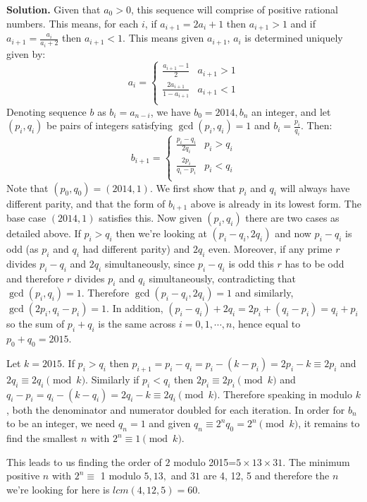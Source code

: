 \documentclass[11pt,a4paper]{article}
\begin{document}
\begin{enumerate}
	\textbf{Solution.} Given that $a_0>0$, this sequence will comprise of positive rational numbers. This means, for each $i$, if $a_{i+1}=2a_i+1$ then $a_{i+1}>1$ and if $a_{i+1}=\frac{a_i}{a_i+2}$ then $a_{i+1}<1$. This means given $a_{i+1}$, $a_i$ is determined uniquely given by: 
	\[
	a_{i}=\begin{cases}
	\frac{a_{i+1}-1}{2} & a_{i+1}> 1\\
	\frac{2a_{i+1}}{1-a_{i+1}} & a_{i+1} < 1\\
	\end{cases}
	\]
	Denoting sequence $b$ as $b_i=a_{n-i}$, we have $b_0=2014, b_n$ an integer, and let $(p_i, q_i)$ be pairs of integers satisfying $\gcd(p_i, q_i)=1$ and $b_i=\frac{p_i}{q_i}$. Then: 
	\[
	b_{i+1}=\begin{cases}
	\frac{p_i-q_i}{2q_i} & p_i>q_i\\
	\frac{2p_i}{q_i-p_i} & p_i<q_i\\
	\end{cases}
	\]
	Note that $(p_0, q_0)=(2014, 1)$. 
	We first show that $p_i$ and $q_i$ will always have different parity, and that the form of $b_{i+1}$ above is already in its lowest form. The base case $(2014, 1)$ satisfies this. Now given $(p_i, q_i)$ there are two cases as detailed above. If $p_i>q_i$ then we're looking at $(p_i-q_i, 2q_i)$ and now $p_i-q_i$ is odd (as $p_i$ and $q_i$ had different parity) and $2q_i$ even. Moreover, if any prime $r$ divides $p_i-q_i$ and $2q_i$ simultaneously, since $p_i-q_i$ is odd this $r$ has to be odd and therefore $r$ divides $p_i$ and $q_i$ simultaneously, contradicting that $\gcd(p_i, q_i)=1$. Therefore $\gcd(p_i-q_i, 2q_i)=1$ and similarly, $\gcd(2p_i, q_i-p_i)=1$. 
	In addition, $(p_i-q_i)+2q_i=2p_i+(q_i-p_i)=q_i+p_i$ so the sum of $p_i+q_i$ is the same across $i=0, 1, \cdots , n$, hence equal to $p_0+q_0=2015$. 
	
	Let $k=2015$. If $p_i>q_i$ then $p_{i+1}=p_i-q_i= p_i-(k-p_i)=2p_i-k\equiv 2p_i$ and $2q_i\equiv 2q_i\pmod{k}$. Similarly if $p_i<q_i$ then $2p_i\equiv 2p_i\pmod{k}$ and $q_i-p_i=q_i-(k-q_i)=2q_i-k\equiv 2q_i\pmod{k}$. Therefore speaking in modulo $k$, both the denominator and numerator doubled for each iteration. In order for $b_n$ to be an integer, we need $q_n=1$ and given $q_n\equiv 2^nq_0=2^n\pmod{k}$, it remains to find the smallest $n$ with $2^n\equiv 1\pmod{k}$. 
	
	This leads to us finding the order of $2$ modulo 2015=$5\times 13 \times 31$. The minimum positive $n$ with $2^n\equiv$ 1 modulo $5, 13,$ and $31$ are 4, 12, 5 and therefore the $n$ we're looking for here is $lcm(4, 12, 5)=60$. 
		

\end{enumerate}
\end{document}
